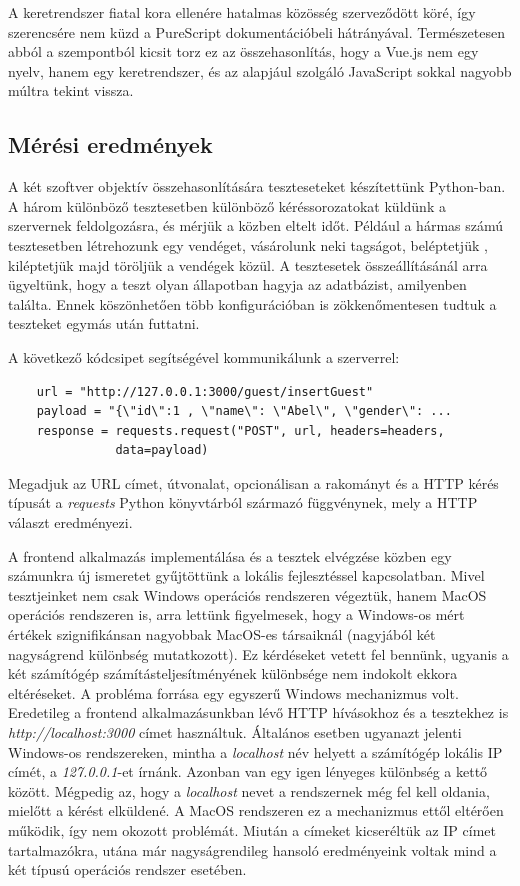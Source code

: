 \documentclass[12pt]{article}
\begin{document}
A keretrendszer fiatal kora ellenére hatalmas közösség szerveződött köré, így szerencsére nem küzd a PureScript dokumentációbeli hátrányával. Természetesen abból a szempontból kicsit torz ez az összehasonlítás, hogy a Vue.js nem egy nyelv, hanem egy keretrendszer, és az alapjául szolgáló JavaScript sokkal nagyobb múltra tekint vissza.

\subsection{Mérési eredmények}

A két szoftver objektív összehasonlítására teszteseteket készítettünk Python-ban. A három különböző tesztesetben különböző kéréssorozatokat küldünk a szervernek feldolgozásra, és mérjük a közben eltelt időt. Például a hármas számú tesztesetben létrehozunk egy vendéget,  vásárolunk neki tagságot,  beléptetjük , kiléptetjük majd töröljük a vendégek közül.  A tesztesetek összeállításánál arra ügyeltünk, hogy a teszt olyan állapotban hagyja az adatbázist, amilyenben találta. Ennek köszönhetően több konfigurációban is zökkenőmentesen tudtuk a teszteket egymás után futtatni.

A következő kódcsipet segítségével kommunikálunk a szerverrel:
\begin{verbatim}
    url = "http://127.0.0.1:3000/guest/insertGuest"
    payload = "{\"id\":1 , \"name\": \"Abel\", \"gender\": ...
    response = requests.request("POST", url, headers=headers, 
               data=payload)
\end{verbatim}

Megadjuk az URL címet, útvonalat, opcionálisan a rakományt és a HTTP kérés típusát a \textit{requests} Python könyvtárból származó függvénynek, mely a HTTP választ eredményezi.

A frontend alkalmazás implementálása és a tesztek elvégzése közben egy számunkra új ismeretet gyűjtöttünk a lokális fejlesztéssel kapcsolatban. Mivel tesztjeinket nem csak Windows operációs rendszeren végeztük, hanem MacOS operációs rendszeren is, arra lettünk figyelmesek, hogy a Windows-os mért értékek szignifikánsan nagyobbak MacOS-es társaiknál (nagyjából két nagyságrend különbség mutatkozott). Ez kérdéseket vetett fel bennünk, ugyanis a két számítógép számításteljesítményének különbsége nem indokolt ekkora eltéréseket. A probléma forrása egy egyszerű Windows mechanizmus volt. Eredetileg a frontend alkalmazásunkban lévő HTTP hívásokhoz és a tesztekhez is \textit{http://localhost:3000} címet használtuk. Általános esetben ugyanazt jelenti Windows-os rendszereken, mintha a \textit{localhost} név helyett a számítógép lokális IP címét, a \textit{127.0.0.1}-et írnánk. Azonban van egy igen lényeges különbség a kettő között. Mégpedig az, hogy a \textit{localhost} nevet a rendszernek még fel kell oldania, mielőtt a kérést elküldené. A MacOS rendszeren ez a mechanizmus ettől eltérően működik, így nem okozott problémát. Miután a címeket kicseréltük az IP címet tartalmazókra, utána már nagyságrendileg hansoló eredményeink voltak mind a két típusú operációs rendszer esetében.
\end{document}
